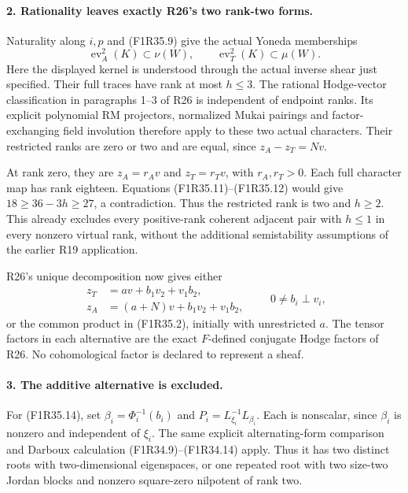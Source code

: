 \paragraph{2. Rationality leaves exactly R26's two rank-two forms.}
Naturality along $i,p$ and (F1R35.9) give the actual
Yoneda memberships
\[
 \operatorname{ev}_A^2(K)\subset\nu(W),\qquad
 \operatorname{ev}_T^2(K)\subset\mu(W).
 \tag{F1R35.13}
\]
Here the displayed kernel is understood through the
actual inverse shear just specified. Their full traces
have rank at most $h\le3$. The rational Hodge-vector
classification in paragraphs 1--3 of R26 is independent
of endpoint ranks. Its explicit polynomial RM projectors,
normalized Mukai pairings and factor-exchanging field
involution therefore apply to these two actual characters.
Their restricted ranks are zero or two and are equal,
since $z_A-z_T=Nv$.

At rank zero, they are $z_A=r_Av$ and $z_T=r_Tv$,
with $r_A,r_T>0$. Each full character map has rank
eighteen. Equations (F1R35.11)--(F1R35.12) would give
$18\ge36-3h\ge27$, a contradiction. Thus the restricted
rank is two and $h\ge2$. This already excludes every
positive-rank coherent adjacent pair with $h\le1$ in
every nonzero virtual rank, without the additional
semistability assumptions of the earlier R19 application.

R26's unique decomposition now gives either
\[
 \begin{split}
 z_T&=a v+b_1v_2+v_1b_2,\\
 z_A&=(a+N)v+b_1v_2+v_1b_2,
 \end{split}
 \qquad 0\ne b_i\perp v_i,
 \tag{F1R35.14}
\]
or the common product in (F1R35.2), initially with
unrestricted $a$. The tensor factors in each alternative
are the exact $F$-defined conjugate Hodge factors of R26.
No cohomological factor is declared to represent a sheaf.

\paragraph{3. The additive alternative is excluded.}
For (F1R35.14), set $\beta_i=\Phi_i^{-1}(b_i)$ and
$P_i=L_{\xi_i}^{-1}L_{\beta_i}$. Each is nonscalar,
since $\beta_i$ is nonzero and independent of $\xi_i$.
The same explicit alternating-form comparison and
Darboux calculation (F1R34.9)--(F1R34.14) apply.
Thus it has two distinct roots with two-dimensional
eigenspaces, or one repeated root with two size-two
Jordan blocks and nonzero square-zero nilpotent of rank two.

